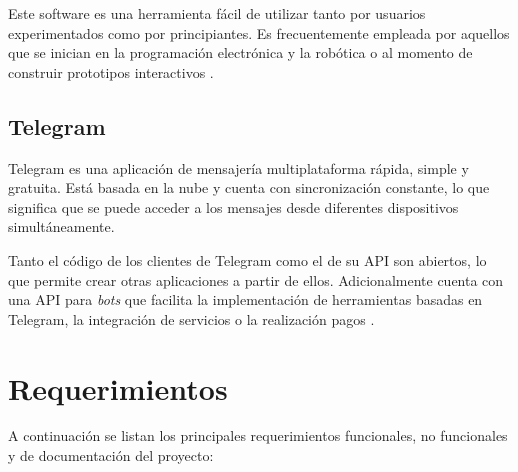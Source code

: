 Este software es una herramienta fácil de utilizar tanto por usuarios experimentados como por principiantes. Es frecuentemente empleada por aquellos que se inician en la programación electrónica y la robótica o al momento de construir prototipos interactivos \citep{arduinoide:2}. 

\subsection{Telegram}
\label{sec:Telegram}

Telegram es una aplicación de mensajería multiplataforma rápida, simple y gratuita. Está basada en la nube y cuenta con sincronización constante, lo que significa que se puede acceder a los mensajes desde diferentes dispositivos simultáneamente. 

Tanto el código de los clientes de Telegram como el de su API son abiertos, lo que permite crear otras aplicaciones a partir de ellos. Adicionalmente cuenta con una API para \textit{bots} que facilita la implementación de herramientas basadas en Telegram, la integración de servicios o la realización pagos \citep{telegram}.
 
  

\section{Requerimientos}
\label{sec:Requerimientos}

A continuación se listan los principales requerimientos funcionales,  no funcionales y de documentación del proyecto:

